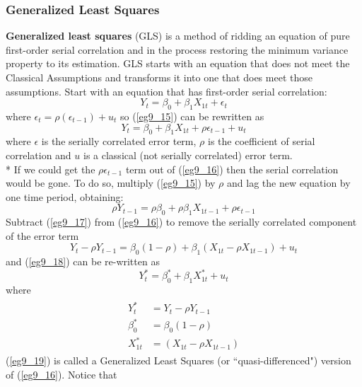 \documentclass[11pt]{article}
\begin{document}
\subsubsection{Generalized Least Squares}
\textbf{Generalized least squares} (GLS) is a method of ridding an equation of pure first-order serial correlation and in the process restoring the minimum variance property to its estimation. GLS starts with an equation that does not meet the Classical Assumptions and transforms it into one that does meet those assumptions. Start with an equation that has first-order serial correlation:
\begin{equation}
Y_t = \beta_0 + \beta_1X_{1t} + \epsilon_t \label{eg9_15}
\end{equation}
where $\epsilon_t = \rho(\epsilon_{t-1}) + u_t$ so (\ref{eg9_15}) can be rewritten as
\begin{equation}
Y_t = \beta_0 + \beta_1X_{1t} + \rho\epsilon_{t-1} + u_t \label{eg9_16}
\end{equation}
where $\epsilon$ is the serially correlated error term, $\rho$ is the coefficient of serial correlation and $u$ is a classical (not serially correlated) error term.\\*
If we could get the $\rho\epsilon_{t-1}$ term out of (\ref{eg9_16}) then the serial correlation would be gone. To do so, multiply (\ref{eg9_15}) by $\rho$ and lag the new equation by one time period, obtaining:
\begin{equation}
\rho Y_{t-1} = \rho\beta_0 + \rho\beta_1X_{1t-1} + \rho\epsilon_{t-1}
\label{eg9_17}
\end{equation}
Subtract (\ref{eg9_17}) from (\ref{eg9_16}) to remove the serially correlated component of the error term
\begin{equation}
Y_t - \rho Y_{t-1} = \beta_0 (1-\rho) + \beta_1 (X_{1t} - \rho X_{1t-1}) + u_t \label{eg9_18}
\end{equation}
and (\ref{eg9_18}) can be re-written as
\begin{equation}
Y_t^* = \beta_0^* + \beta_1X_{1t}^* + u_t \label{eg9_19}
\end{equation}
where
\begin{align}
\label{eg9_20}
\begin{split}
Y_t^* &= Y_t - \rho Y_{t-1}\\
\beta_0^* &= \beta_0 (1-\rho)\\
X_{1t}^* &=(X_{1t} - \rho X_{1t-1})
\end{split}
\end{align}
(\ref{eg9_19}) is called a Generalized Least Squares (or ``quasi-differenced") version of (\ref{eg9_16}). Notice that
\end{document}
